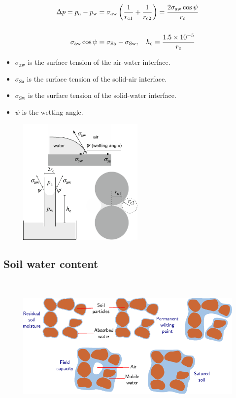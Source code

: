 \begin{frame}
	\frametitle{\subsecname}
	\begin{minipage}{0.5\textwidth}
		\begin{align*}
			\Delta p=p_{\mathrm{a}}-p_{\mathrm{w}} & =
			\sigma_{\mathrm{aw}}\left(\frac{1}{r_{\mathrm{c} 1}}+\frac{1}{r_{\mathrm{c} 2}}\right)
			=\frac{2 \sigma_{\mathrm{aw}} \cos \psi}{r_{\mathrm{c}}}                                  \\[\baselineskip]
			\sigma_{\mathrm{aw}}\cos\psi           & =\sigma_{\mathrm{Sa}}-\sigma_{\mathrm{Sw}},\quad
			h_{\mathrm{c}} =\frac{1.5 \times 10^{-5}}{r_{\mathrm{c}}}
		\end{align*}
		\begin{itemize}
			\item $\sigma_{\mathrm{aw}}$ is the surface tension of the air-water interface.
			\item $\sigma_{\mathrm{Sa}}$ is the surface tension of the solid-air interface.
			\item $\sigma_{\mathrm{Sw}}$ is the surface tension of the solid-water interface.
			\item $\psi$ is the wetting angle.
		\end{itemize}
	\end{minipage}
	\begin{minipage}{0.47\textwidth}
		\begin{figure}[ht!]
			\centering
			\includegraphics[height=6.2cm]{capillar_preassure}
		\end{figure}
	\end{minipage}
\end{frame}

\subsection{Soil water content} %
\begin{frame}
	\frametitle{\subsecname}
	\begin{figure}[ht!]
		\centering
		\includegraphics[height=6.8cm]{wetness}
	\end{figure}
\end{frame}